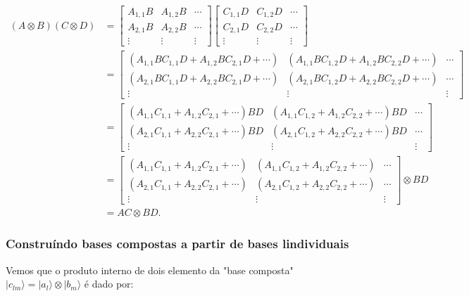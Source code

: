 \documentclass[11pt]{article}
\begin{document}
\begin{align}
(A\otimes B)(C\otimes D)& = \begin{bmatrix}A_{1,1}B & A_{1,2}B & \cdots \\ A_{2,1}B & A_{2,2}B & \cdots \\ \vdots & \vdots & \vdots\end{bmatrix} \begin{bmatrix}C_{1,1}D & C_{1,2}D & \cdots \\ C_{2,1}D & C_{2,2}D & \cdots \\ \vdots & \vdots & \vdots\end{bmatrix} \\
& = \begin{bmatrix}(A_{1,1}BC_{1,1}D+A_{1,2}BC_{2,1}D+\cdots) & (A_{1,1}BC_{1,2}D+A_{1,2}BC_{2,2}D+\cdots)& \cdots \\ (A_{2,1}BC_{1,1}D+A_{2,2}BC_{2,1}D+\cdots) & (A_{2,1}BC_{1,2}D+A_{2,2}BC_{2,2}D+\cdots) & \cdots \\ \vdots & \vdots & \vdots\end{bmatrix} \\
& = \begin{bmatrix}(A_{1,1}C_{1,1}+A_{1,2}C_{2,1}+\cdots)BD & (A_{1,1}C_{1,2}+A_{1,2}C_{2,2}+\cdots)BD & \cdots \\ (A_{2,1}C_{1,1}+A_{2,2}C_{2,1}+\cdots)BD & (A_{2,1}C_{1,2}+A_{2,2}C_{2,2}+\cdots)BD & \cdots \\ \vdots & \vdots & \vdots\end{bmatrix} \\
& = \begin{bmatrix}(A_{1,1}C_{1,1}+A_{1,2}C_{2,1}+\cdots) & (A_{1,1}C_{1,2}+A_{1,2}C_{2,2}+\cdots) & \cdots \\ (A_{2,1}C_{1,1}+A_{2,2}C_{2,1}+\cdots) & (A_{2,1}C_{1,2}+A_{2,2}C_{2,2}+\cdots) & \cdots \\ \vdots & \vdots & \vdots\end{bmatrix}\otimes BD \\
& = AC\otimes BD.
\end{align}

    \subsubsection{Construíndo bases compostas a partir de bases
lindividuais}\label{construuxedndo-bases-compostas-a-partir-de-bases-lindividuais}

Vemos que o produto interno de dois elemento da "base composta"
\(|c_{lm}\rangle=|a_{l}\rangle\otimes|b_{m}\rangle\) é dado por:
\end{document}
